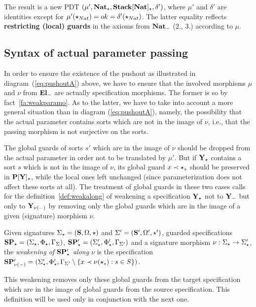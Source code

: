 The result is  a new PDT
$\pdtsp{\mu'}{\delta'}{\thr{Nat_\cons}}{\thr{Stack[Nat]_\cons}}$, where
$\mu'$ and $\delta'$ are identities except for 
$\mu'(\cons_{Nat}) = ok =\delta'(\cons_{Nat})$.
The latter equality reflects {\bf restricting (local) guards} in the axioms from ${\bf
 Nat}_{\weak}$ (2., 3.) according to $\mu$.

\subsection{Syntax of actual parameter passing}\label{sub:appsyn}
In order to ensure the existence of the pushout as illustrated in
diagram~(\ref{eq:pushoutA}) above, we have to ensure that the involved morphisms $\mu$
and $\nu$ from ${\bf El}_\weak$ are actually specification morphisms. The
former is so by fact~\ref{fa:weakparamo}. As to the latter, we have to
take into account a more general situation than in diagram
(\ref{eq:pushoutA}), namely, the possibility that 
the actual parameter contains sorts which are not in the image of $\nu$, i.e., 
that the passing morphism is not surjective on the sorts.

The global guards of sorts $s'$ which are in the image of $\nu$ should be
dropped from the actual parameter in order not to be translated by $\mu'$.
But if $\thr Y_\cons$ contains a sort $s$ which is not in the image of $\nu$, its
global guard $x\prec \cons_s$ should be preserved in $\thr{P[Y]_\cons}$,
while the local ones left unchanged (since parameterization does not affect
these sorts at all).
The treatment of global guards in these two cases calls for the 
definition~\ref{def:weakalong} of weakening a specification
$\thr{Y}_\cons$ not to $\thr{Y}_\weak$ but only to $\thr{Y}_{\nu(-)}$ by removing
only the global guards which are in the image of a given (signature)
morphism $\nu$. 

\begin{definition}\label{def:weakalong}
Given signatures $\Sigma_\cons=(\Sorts,\Ops,\cons)$ and
$\Sigma'=(\Sorts',\Ops',\cons')$, guarded specifications
$\thr{SP_\cons}=(\Sigma_\cons,\Phi_\cons,\Modax_\Sigma)$,
$\thr{SP'_\cons}=(\Sigma'_\cons,\Phi'_\cons,\Modax_{\Sigma'})$ and a
signature morphism $\nu:\Sigma_\cons\to\Sigma'_\cons$, the {\em weakening of
$\thr{SP'_\cons}$ along $\nu$} is the specification $\thr{SP'_{\nu(\weak)}} =
(\Sigma'_\cons,\Phi'_\cons,\Modax_{\Sigma'}\setminus\{x\prec\nu(\cons_s):s\in
S\})$.
\end{definition}
This weakening removes only these global guards from the target specification
which are in the image of global guards from the source specification. 
This definition will be used only in conjunction with the next one.

